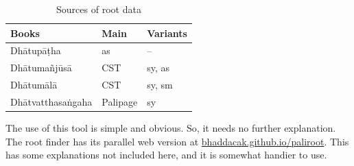 \newpage
\begin{table}[!hbt]
\centering
\caption{Sources of root data}
\label{tab:root-sources}
\bigskip
\begin{tabular}{lll} \toprule
\bfseries Books & \bfseries Main & \bfseries Variants \\ \midrule
Dhātupāṭha & as & -- \\
Dhātumañjūsā & CST & sy, as \\
Dhātumālā & CST & sy, sm \\
Dhātvatthasaṅgaha & Palipage & sy \\
\bottomrule
\end{tabular}
\end{table}

The use of this tool is simple and obvious. So, it needs no further explanation. The root finder has its parallel web version at \url{bhaddacak.github.io/paliroot}. This has some explanations not included here, and it is somewhat handier to use.
